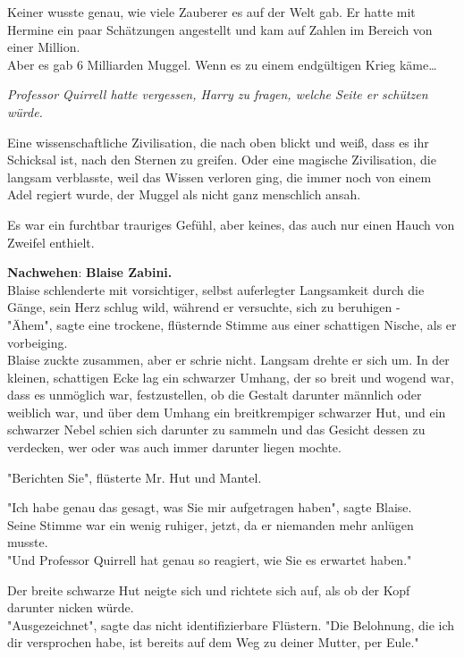 {Keiner wusste genau, wie viele Zauberer es auf der Welt gab. Er hatte mit Hermine ein paar Schätzungen angestellt und kam auf Zahlen im Bereich von einer Million.\\ Aber es gab 6 Milliarden Muggel. Wenn es zu einem endgültigen Krieg käme…

\emph{Professor Quirrell hatte vergessen, Harry zu fragen, welche Seite er schützen würde.}

Eine wissenschaftliche Zivilisation, die nach oben blickt und weiß, dass es ihr Schicksal ist, nach den Sternen zu greifen. Oder eine magische Zivilisation, die langsam verblasste, weil das Wissen verloren ging, die immer noch von einem Adel regiert wurde, der Muggel als nicht ganz menschlich ansah.

Es war ein furchtbar trauriges Gefühl, aber keines, das auch nur einen Hauch von Zweifel enthielt.

\textbf{Nachwehen}: \textbf{Blaise Zabini.}\\ Blaise schlenderte mit vorsichtiger, selbst auferlegter Langsamkeit durch die Gänge, sein Herz schlug wild, während er versuchte, sich zu beruhigen -\\ "Ähem", sagte eine trockene, flüsternde Stimme aus einer schattigen Nische, als er vorbeiging.\\ Blaise zuckte zusammen, aber er schrie nicht. Langsam drehte er sich um. In der kleinen, schattigen Ecke lag ein schwarzer Umhang, der so breit und wogend war, dass es unmöglich war, festzustellen, ob die Gestalt darunter männlich oder weiblich war, und über dem Umhang ein breitkrempiger schwarzer Hut, und ein schwarzer Nebel schien sich darunter zu sammeln und das Gesicht dessen zu verdecken, wer oder was auch immer darunter liegen mochte.

"Berichten Sie", flüsterte Mr. Hut und Mantel.

"Ich habe genau das gesagt, was Sie mir aufgetragen haben", sagte Blaise.\\ Seine Stimme war ein wenig ruhiger, jetzt, da er niemanden mehr anlügen musste.\\ "Und Professor Quirrell hat genau so reagiert, wie Sie es erwartet haben."

Der breite schwarze Hut neigte sich und richtete sich auf, als ob der Kopf darunter nicken würde.\\ "Ausgezeichnet", sagte das nicht identifizierbare Flüstern. "Die Belohnung, die ich dir versprochen habe, ist bereits auf dem Weg zu deiner Mutter, per Eule."

}
